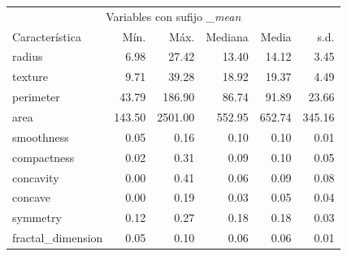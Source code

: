 \begin{tabular*}{\textwidth}{@{\extracolsep{\fill}}lrrrrr}
\toprule
  \multicolumn{6}{c}{Variables con sufijo \textit{\_mean}} \\
Característica & Mín. & Máx. & Mediana & Media & s.d. \\
\midrule
radius & 6.98 & 27.42 & 13.40 & 14.12 & 3.45\\
texture & 9.71 & 39.28 & 18.92 & 19.37 & 4.49\\
perimeter & 43.79 & 186.90 & 86.74 & 91.89 & 23.66\\
area & 143.50 & 2501.00 & 552.95 & 652.74 & 345.16\\
smoothness & 0.05 & 0.16 & 0.10 & 0.10 & 0.01\\
\addlinespace
compactness & 0.02 & 0.31 & 0.09 & 0.10 & 0.05\\
concavity & 0.00 & 0.41 & 0.06 & 0.09 & 0.08\\
concave & 0.00 & 0.19 & 0.03 & 0.05 & 0.04\\
symmetry & 0.12 & 0.27 & 0.18 & 0.18 & 0.03\\
fractal\_dimension & 0.05 & 0.10 & 0.06 & 0.06 & 0.01\\
\bottomrule
\end{tabular*}
